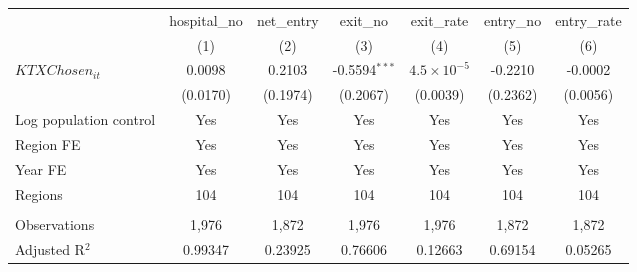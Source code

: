\begingroup
\centering
\begin{tabular}{lcccccc}
   \toprule
                          & hospital\_no  & net\_entry  & exit\_no        & exit\_rate           & entry\_no  & entry\_rate \\    
                          & (1)           & (2)         & (3)             & (4)                  & (5)        & (6)\\  
   \midrule 
   $KTXChosen_{it}$       & 0.0098        & 0.2103      & -0.5594$^{***}$ & $4.5\times 10^{-5}$  & -0.2210    & -0.0002\\   
                          & (0.0170)      & (0.1974)    & (0.2067)        & (0.0039)             & (0.2362)   & (0.0056)\\   
   Log population control & Yes           & Yes         & Yes             & Yes                  & Yes        & Yes\\  
   Region FE              & Yes           & Yes         & Yes             & Yes                  & Yes        & Yes\\  
   Year FE                & Yes           & Yes         & Yes             & Yes                  & Yes        & Yes\\  
   Regions                & 104           & 104         & 104             & 104                  & 104        & 104\\  
    \\
   Observations           & 1,976         & 1,872       & 1,976           & 1,976                & 1,872      & 1,872\\  
   Adjusted R$^2$         & 0.99347       & 0.23925     & 0.76606         & 0.12663              & 0.69154    & 0.05265\\  
   \bottomrule
\end{tabular}
\par\endgroup
